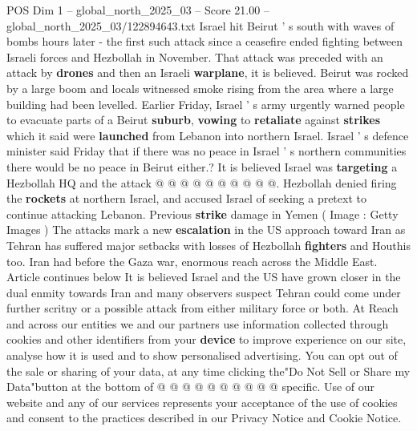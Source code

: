 \begin{textsample}{POS Dim 1 – global\_north\_2025\_03 – Score 21.00 – global\_north\_2025\_03/122894643.txt}
Israel hit Beirut ' s south with waves of bombs hours later - the first such attack since a ceasefire ended fighting between Israeli forces and Hezbollah in November.
That attack was preceded with an attack by \textbf{drones} and then an Israeli \textbf{warplane}, it is believed.
Beirut was rocked by a large boom and locals witnessed smoke rising from the area where a large building had been levelled.
Earlier Friday, Israel ' s army urgently warned people to evacuate parts of a Beirut \textbf{suburb}, \textbf{vowing} to \textbf{retaliate} against \textbf{strikes} which it said were \textbf{launched} from Lebanon into northern Israel.
Israel ' s defence minister said Friday that if there was no peace in Israel ' s northern communities there would be no peace in Beirut either.?
It is believed Israel was \textbf{targeting} a Hezbollah HQ and the attack @ @ @ @ @ @ @ @ @ @.
Hezbollah denied firing the \textbf{rockets} at northern Israel, and accused Israel of seeking a pretext to continue attacking Lebanon.
Previous \textbf{strike} damage in Yemen ( Image : Getty Images ) The attacks mark a new \textbf{escalation} in the US approach toward Iran as Tehran has suffered major setbacks with losses of Hezbollah \textbf{fighters} and Houthis too.
Iran had before the Gaza war, enormous reach across the Middle East.
Article continues below It is believed Israel and the US have grown closer in the dual enmity towards Iran and many observers suspect Tehran could come under further scritny or a possible attack from either military force or both.
At Reach and across our entities we and our partners use information collected through cookies and other identifiers from your \textbf{device} to improve experience on our site, analyse how it is used and to show personalised advertising.
You can opt out of the sale or sharing of your data, at any time clicking the"Do Not Sell or Share my Data"button at the bottom of @ @ @ @ @ @ @ @ @ @ specific.
Use of our website and any of our services represents your acceptance of the use of cookies and consent to the practices described in our Privacy Notice and Cookie Notice.

\end{textsample}

